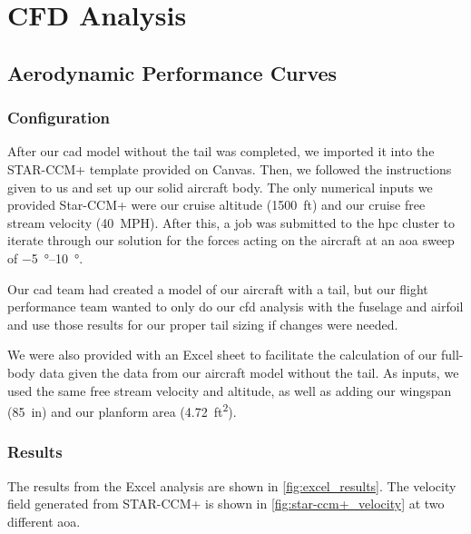 \chapter{CFD Analysis}\label{cp:cfd}

\section{Aerodynamic Performance Curves}\label{sec:aero_perf_curves}

\subsection{Configuration}\label{ssec:configuration}

After our \acrshort{cad} model without the tail was completed, we imported it into the STAR-CCM+ template provided on Canvas. Then, we followed the instructions given to us and set up our solid aircraft body. The only numerical inputs we provided Star-CCM+ were our cruise altitude (\qty{1500}{ft}) and our cruise free stream velocity (\qty{40}{MPH}). After this, a job was submitted to the \acrfull{hpc} cluster to iterate through our solution for the forces acting on the aircraft at an \acrfull{aoa} sweep of \qtyrange{-5}{10}{\degree}. 

Our \acrshort{cad} team had created a model of our aircraft with a tail, but our flight performance team wanted to only do our \acrfull{cfd} analysis with the fuselage and airfoil and use those results for our proper tail sizing if changes were needed.

We were also provided with an Excel sheet to facilitate the calculation of our full-body data given the data from our aircraft model without the tail. As inputs, we used the same free stream velocity and altitude, as well as adding our wingspan (\qty{85}{in}) and our planform area (\qty{4.72}{ft^2}). 

\newpage

\subsection{Results}\label{ssec:results}

The results from the Excel analysis are shown in \autoref{fig:excel_results}. The velocity field generated from STAR-CCM+ is shown in \autoref{fig:star-ccm+_velocity} at two different \acrshort{aoa}.

